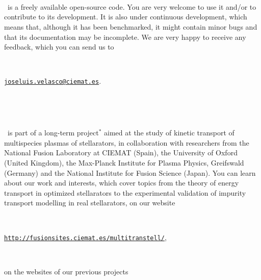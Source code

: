 

\

\

\

\

\

\

\


\normalsize
\begin{tcolorbox}[colback=gray!5,colframe=gray!40!black]

\

%
%
%
%


\KNOSOS~is a freely available open-source code. You are very welcome to use it and/or to contribute to its development. It is also under continuous development, which means that, although it has been benchmarked, it might contain minor bugs and that its documentation may be incomplete. We are very happy to receive any feedback, which you can send us to 

\

\href{mailto:joseluis.velasco@ciemat.es}{\nolinkurl{joseluis.velasco@ciemat.es}}.

\

\

\KNOSOS~is part of a long-term project$^*$ aimed at the study of kinetic transport of multispecies plasmas of stellarators, in collaboration with researchers from the National Fusion Laboratory at CIEMAT (Spain), the University of Oxford (United Kingdom), the Max-Planck Institute for Plasma Physics, Greifswald (Germany) and the National Institute for Fusion Science (Japan). You can learn about our work and interests, which cover topics from the theory of energy transport in optimized stellarators to the experimental validation of impurity transport modelling in real stellarators, on our website

\

\href{http://fusionsites.ciemat.es/multitranstell//}{\nolinkurl{http://fusionsites.ciemat.es/multitranstell/}}, 

\

on the websites of our previous projects


\end{tcolorbox}
